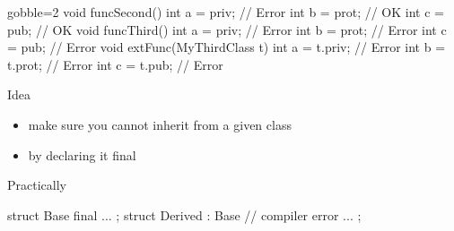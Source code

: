 \begin{frame}[fragile]
  \begin{multicols}{2}
    \columnbreak
    \begin{cppcode*}{gobble=2}
      void funcSecond() {
        int a = priv;   // Error
        int b = prot;   // OK
        int c = pub;    // OK
      }
      void funcThird() {
        int a = priv;   // Error
        int b = prot;   // Error
        int c = pub;    // Error
      }
      void extFunc(MyThirdClass t) {
        int a = t.priv; // Error
        int b = t.prot; // Error
        int c = t.pub;  // Error
      }
    \end{cppcode*}
  \end{multicols}
\end{frame}

\begin{frame}[fragile]
  \begin{block}{Idea}
    \begin{itemize}
    \item make sure you cannot inherit from a given class
    \item by declaring it final
    \end{itemize}
  \end{block}
  \begin{exampleblock}{Practically}
    \begin{cppcode}
      struct Base final {
        ...
      };
      struct Derived : Base { // compiler error
        ...
      };
    \end{cppcode}
  \end{exampleblock}
\end{frame}

